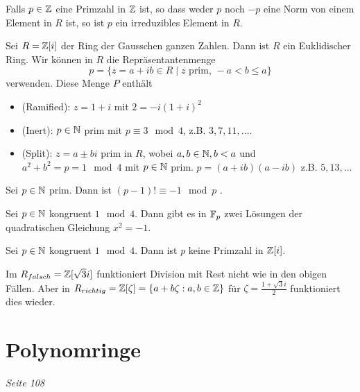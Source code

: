 \begin{lemma}
	Falls $p \in \mathbb{Z}$ eine Primzahl in $\mathbb{Z}$ ist, so dass weder  $p$ noch $-p$ eine Norm von einem Element
	in $R$ ist, so ist $p$ ein irreduzibles Element in $R$.
\end{lemma}




\begin{theorem}
	Sei $R = \mathbb{Z}[i]$ der Ring der Gausschen ganzen Zahlen.
	Dann ist $R$ ein Euklidischer Ring. Wir können in $R$ die Repräsentantenmenge
	\[
	p = \{z = a + ib \in R \mid z \text{ prim, } -a < b \leq a\} 
	\] 
	verwenden. Diese Menge $P$ enthält
	\begin{itemize}
		\item (Ramified): $z = 1+i$ mit $2 = -i (1+i)^2$
		\item (Inert): $p \in \mathbb{N}$ prim mit $p \equiv 3 \mod 4$,
			z.B. $3,7,11,\ldots$.
		\item (Split): $z = a \pm b i$ prim in $R$, wobei $a,b \in \mathbb{N}, b < a$ und
			$a^2 + b^2 = p = 1 \mod 4$ mit $p \in \mathbb{N}$ prim. $p = (a+ib)(a-ib)$ 
			z.B. $5,13,\ldots$
	\end{itemize}
\end{theorem}

\begin{lemma}
	Sei $p \in \mathbb{N}$ prim. Dann ist $(p-1)! \equiv -1 \mod p$ .
\end{lemma}


\begin{proposition}
	Sei $p \in \mathbb{N}$ kongruent $1 \mod 4$.
	Dann gibt es in  $\mathbb{F}_{p}$ zwei Lösungen der quadratischen Gleichung $x^2 = -1$.
\end{proposition}



\begin{corollary}
	Sei $p \in \mathbb{N}$ kongruent $1 \mod 4$. Dann ist $p$ keine Primzahl in $\mathbb{Z}[i]$.
\end{corollary}




\begin{theorem}
	Im $R_{falsch} = \mathbb{Z}[\sqrt{3}i]$ funktioniert Division mit Rest nicht wie in den obigen Fällen.
	Aber in $R_{richtig} = \mathbb{Z}[\zeta] = \{a+b \zeta : a,b \in \mathbb{Z}\} $ für $\zeta = \frac{1+\sqrt{3} i}{2}$ funktioniert dies wieder.
\end{theorem}




\section{Polynomringe}
\emph{Seite 108}

